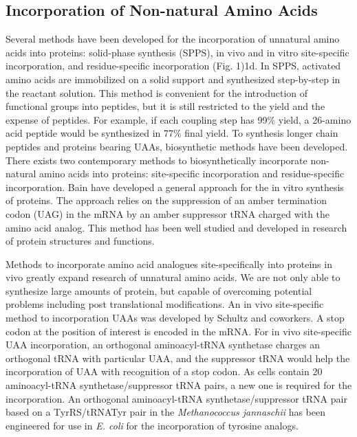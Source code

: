 \begin{refsection}
\subsection{Incorporation of Non-natural Amino Acids}
\label{sec:rsi}

Several methods have been developed for the incorporation of unnatural amino
acids into proteins: solid-phase synthesis (SPPS)\cite{Mahto2011}, in vivo and
in vitro site-specific incorporation,\cite{Cellitti2008,Hassan2008} and
residue-specific incorporation (Fig. 1)1d.\cite{Johnson2010} In SPPS, activated
amino acids are immobilized on a solid support and synthesized step-by-step in
the reactant solution. This method is convenient for the introduction of
functional groups into peptides, but it is still restricted to the yield and
the expense of peptides. For example, if each coupling step has 99\% yield, a
26-amino acid peptide would be synthesized in 77\% final yield. To synthesis
longer chain peptides and proteins bearing UAAs, biosynthetic methods have been
developed.  There exists two contemporary methods to biosynthetically
incorporate non-natural amino acids into proteins: site-specific incorporation
and residue-specific incorporation. Bain  have developed a
general approach for the in vitro synthesis of proteins.\cite{Bain1991} The
approach relies on the suppression of an amber termination codon (UAG) in the
mRNA by an amber suppressor tRNA charged with the amino acid analog. This
method has been well studied and developed in research of protein structures
and functions.\cite{Martoglio1995,Eichler1997} 

Methods to incorporate amino acid analogues site-specifically into proteins in
vivo greatly expand research of unnatural amino acids. We are not only able to
synthesize large amounts of protein, but capable of overcoming potential
problems including post translational modifications. An in vivo site-specific
method to incorporation UAAs was developed by Schultz and
coworkers.\cite{Wang2001,Wang2002} A stop codon at the position of interest is
encoded in the mRNA. For in vivo site-specific UAA incorporation, an orthogonal
aminoacyl-tRNA synthetase charges an orthogonal tRNA with particular UAA, and
the suppressor tRNA would help the incorporation of UAA with recognition of a
stop codon. As cells contain 20 aminoacyl-tRNA synthetase/suppressor tRNA
pairs, a new one is required for the incorporation. An orthogonal
aminoacyl-tRNA synthetase/suppressor tRNA pair based on a TyrRS/tRNATyr pair in
the \emph{Methanococcus jannaschii} has been engineered for use in \emph{E.
coli} for the incorporation of tyrosine analogs.\cite{Wang2001}


\end{refsection}
